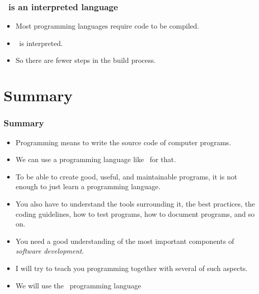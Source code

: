 \documentclass[aspectratio=169,mathserif,notheorems]{beamer}%
\begin{document}
\begin{frame}[t]%
\frametitle{\python\ is an interpreted language}%
\begin{itemize}%
\item Most programming languages require code to be compiled.%
\item<8-> \python\ is interpreted.%
\item<12-> So there are fewer steps in the build process.%
\end{itemize}%
%
%
%
%
%
%
%
%
%
%
\end{frame}%
%
\section{Summary}%
%
\begin{frame}\frametitle{Summary}%
%
\begin{itemize}%
\item Programming means to write the source code of computer programs.%
\item<2-> We can use a programming language like \python\ for that.%
\item<3-> To be able to create good, useful, and maintainable programs, it is not enough to just learn a programming language.%
\item<4-> You also have to understand the tools surrounding it, the best practices, the coding guidelines, how to test programs, how to document programs, and so on.%
\item<5-> You need a good understanding of the most important components of \emph{software development}.
\item<6-> I will try to teach you programming together with several of such aspects.%
\item<7-> We will use the \python\ programming language%
\end{itemize}%
\end{frame}%
%
\endPresentation%
\end{document}
